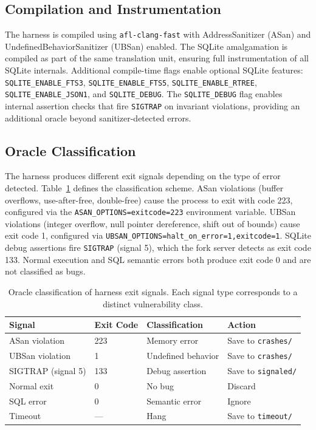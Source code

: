 \subsection{Compilation and Instrumentation}

The harness is compiled using \texttt{afl-clang-fast} with AddressSanitizer (ASan) and UndefinedBehaviorSanitizer (UBSan) enabled. The SQLite amalgamation is compiled as part of the same translation unit, ensuring full instrumentation of all SQLite internals. Additional compile-time flags enable optional SQLite features: \texttt{SQLITE\_ENABLE\_FTS3}, \texttt{SQLITE\_ENABLE\_FTS5}, \texttt{SQLITE\_ENABLE\_RTREE}, \texttt{SQLITE\_ENABLE\_JSON1}, and \texttt{SQLITE\_DEBUG}. The \texttt{SQLITE\_DEBUG} flag enables internal assertion checks that fire \texttt{SIGTRAP} on invariant violations, providing an additional oracle beyond sanitizer-detected errors.

\subsection{Oracle Classification}

The harness produces different exit signals depending on the type of error detected. Table~\ref{tab:oracle} defines the classification scheme. ASan violations (buffer overflows, use-after-free, double-free) cause the process to exit with code 223, configured via the \texttt{ASAN\_OPTIONS=exitcode=223} environment variable. UBSan violations (integer overflow, null pointer dereference, shift out of bounds) cause exit code 1, configured via \texttt{UBSAN\_OPTIONS=halt\_on\_error=1,exitcode=1}. SQLite debug assertions fire \texttt{SIGTRAP} (signal 5), which the fork server detects as exit code 133. Normal execution and SQL semantic errors both produce exit code 0 and are not classified as bugs.

\begin{table}[htbp]
\caption{Oracle classification of harness exit signals. Each signal type corresponds to a distinct vulnerability class.}
\label{tab:oracle}
\centering
\begin{tabular}{llll}
\toprule
\textbf{Signal} & \textbf{Exit Code} & \textbf{Classification} & \textbf{Action} \\
\midrule
ASan violation & 223 & Memory error & Save to \texttt{crashes/} \\
UBSan violation & 1 & Undefined behavior & Save to \texttt{crashes/} \\
SIGTRAP (signal 5) & 133 & Debug assertion & Save to \texttt{signaled/} \\
Normal exit & 0 & No bug & Discard \\
SQL error & 0 & Semantic error & Ignore \\
Timeout & --- & Hang & Save to \texttt{timeout/} \\
\bottomrule
\end{tabular}
\end{table}

